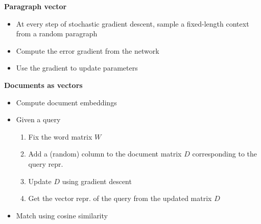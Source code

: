 \begin{enumerate}
\begin{itemize}
\begin{itemize}
            \begin{minipage}{0.32\textwidth}
            \textbf{Paragraph vector} 
            \begin{itemize}
                \setlength\itemsep{0em}
                \item At every step of stochastic gradient descent, sample a fixed-length context from a random paragraph
                \item Compute the error gradient from the network
                \item Use the gradient to update parameters
            \end{itemize}
            \end{minipage}
            \begin{minipage}{0.58\textwidth}
            \textbf{ \;\;\; Documents as vectors} 
            \begin{itemize}
                \setlength\itemsep{0em}
                \item Compute document embeddings
                \item Given a query
                \begin{enumerate}
                    \setlength\itemsep{0em}
                    \item Fix the word matrix $W$
                    \item Add a (random) column to the document matrix $D$ corresponding to the query repr.
                    \item Update $D$ using gradient descent
                    \item Get the vector repr. of the query from the updated matrix $D$
                \end{enumerate}
                \item Match using cosine similarity
            \end{itemize}
            \end{minipage}
        \end{itemize}
    \end{itemize}
\end{enumerate}
